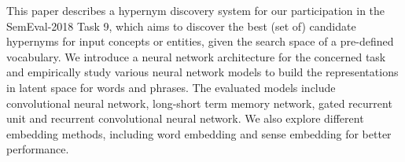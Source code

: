 This paper describes a hypernym discovery system for our participation in the SemEval-2018 Task 9, which aims to discover the best (set of) candidate hypernyms for input concepts or entities, given the search space of a pre-defined vocabulary. We introduce a neural network architecture for the concerned task and empirically study various neural network models to build the representations in latent space for words and phrases. The evaluated models include convolutional neural network, long-short term memory network, gated recurrent unit and recurrent convolutional neural network. We also explore different embedding methods, including word embedding and sense embedding for better performance.
